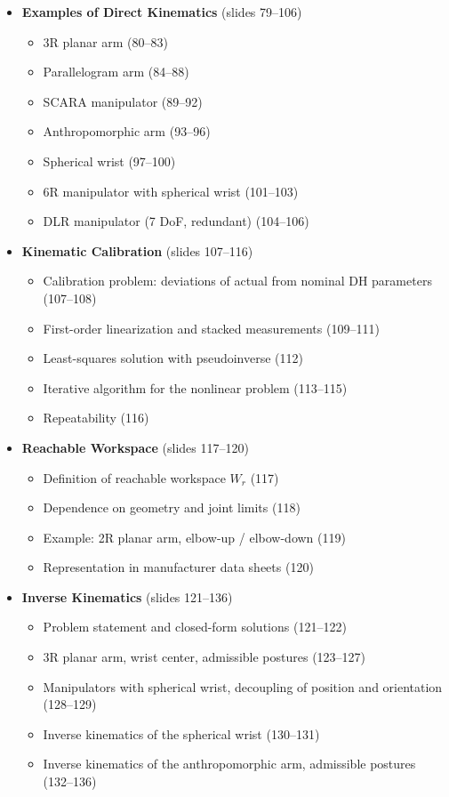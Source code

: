 \begin{itemize}
    \item \textbf{Examples of Direct Kinematics} (slides 79--106)
    \begin{itemize}
        \item 3R planar arm (80--83)
        \item Parallelogram arm (84--88)
        \item SCARA manipulator (89--92)
        \item Anthropomorphic arm (93--96)
        \item Spherical wrist (97--100)
        \item 6R manipulator with spherical wrist (101--103)
        \item DLR manipulator (7 DoF, redundant) (104--106)
    \end{itemize}

    \item \textbf{Kinematic Calibration} (slides 107--116)
    \begin{itemize}
        \item Calibration problem: deviations of actual from nominal DH parameters (107--108)
        \item First-order linearization and stacked measurements (109--111)
        \item Least-squares solution with pseudoinverse (112)
        \item Iterative algorithm for the nonlinear problem (113--115)
        \item Repeatability (116)
    \end{itemize}

    \item \textbf{Reachable Workspace} (slides 117--120)
    \begin{itemize}
        \item Definition of reachable workspace $W_r$ (117)
        \item Dependence on geometry and joint limits (118)
        \item Example: 2R planar arm, elbow-up / elbow-down (119)
        \item Representation in manufacturer data sheets (120)
    \end{itemize}

    \item \textbf{Inverse Kinematics} (slides 121--136)
    \begin{itemize}
        \item Problem statement and closed-form solutions (121--122)
        \item 3R planar arm, wrist center, admissible postures (123--127)
        \item Manipulators with spherical wrist, decoupling of position and orientation (128--129)
        \item Inverse kinematics of the spherical wrist (130--131)
        \item Inverse kinematics of the anthropomorphic arm, admissible postures (132--136)
    \end{itemize}
\end{itemize}

